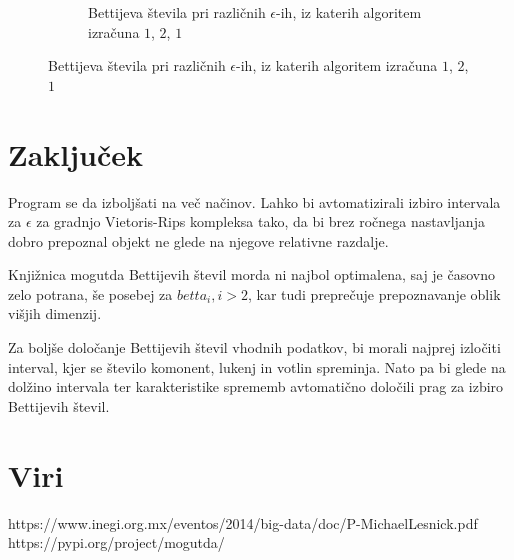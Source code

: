 \documentclass[a4paper,11pt]{article}
\begin{document}
\begin{figure}[h!]
\begin{subfigure}[b]{0.2\linewidth}
          \caption{Bettijeva števila pri različnih $\epsilon$-ih, iz katerih algoritem izračuna $1$, $2$, $1$}
        \end{subfigure}
        \end{figure}


\newpage
\section{Zaključek}

Program se da izboljšati na več načinov. Lahko bi avtomatizirali izbiro intervala za $\epsilon$ za gradnjo Vietoris-Rips kompleksa tako, da bi brez ročnega nastavljanja dobro prepoznal objekt ne glede na njegove relativne razdalje.\par

Knjižnica mogutda Bettijevih števil morda ni najbol optimalena, saj je časovno zelo potrana, še posebej za $betta_i, i>2$, kar tudi preprečuje prepoznavanje oblik višjih dimenzij. \par

Za boljše določanje Bettijevih števil vhodnih podatkov, bi morali najprej izločiti interval, kjer se število komonent, lukenj in votlin spreminja. Nato pa bi glede na dolžino intervala ter karakteristike sprememb avtomatično določili prag za izbiro Bettijevih števil.

\section{Viri}
https://www.inegi.org.mx/eventos/2014/big-data/doc/P-MichaelLesnick.pdf\\
https://pypi.org/project/mogutda/
\end{document}
